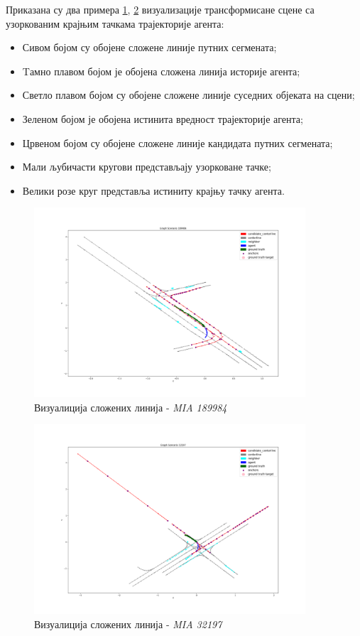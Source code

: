 \documentclass[11pt,oneside]{memoir}
\begin{document}
Приказана су два примера \ref{poly-MIA-189984}, \ref{poly-MIA-32197} визуализације трансформисане сцене са узоркованим крајњим тачкама трајекторије агента:
\begin{itemize}
  \item Сивом бојом су обојене сложене линије путних сегмената; 
  \item Tамно плавом бојом је обојена сложена линија историје агента; 
  \item Светло плавом бојом су обојене сложене линије суседних објеката на сцени;
  \item Зеленом бојом је обојена истинита вредност трајекторије агента;
  \item Црвеном бојом су обојене сложене линије кандидата путних сегмената;
  \item Мали љубичасти кругови представљају узорковане тачке;
  \item Велики розе круг представља истиниту крајњу тачку агента.
\end{itemize}

\begin{figure}[H]
  \centering
  \includegraphics[width=0.9\textwidth]{images/polylines_MIA_189984.png}
  \caption{Визуалиција сложених линија - \textit{MIA 189984} \label{poly-MIA-189984}}
\end{figure}

\begin{figure}[H]
  \centering
  \includegraphics[width=0.9\textwidth]{images/polylines_MIA_32197.png}
  \caption{Визуалиција сложених линија - \textit{MIA 32197} \label{poly-MIA-32197}}
\end{figure}
\end{document}
